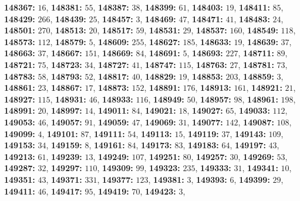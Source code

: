 \textsf{\bfseries 148367:} $16$, \textsf{\bfseries 148381:} $55$, \textsf{\bfseries 148387:} $38$, \textsf{\bfseries 148399:} $61$, \textsf{\bfseries 148403:} $19$, \textsf{\bfseries 148411:} $85$, \textsf{\bfseries 148429:} $266$, \textsf{\bfseries 148439:} $25$, \textsf{\bfseries 148457:} $3$, \textsf{\bfseries 148469:} $47$, \textsf{\bfseries 148471:} $41$, \textsf{\bfseries 148483:} $24$, \textsf{\bfseries 148501:} $270$, \textsf{\bfseries 148513:} $20$, \textsf{\bfseries 148517:} $59$, \textsf{\bfseries 148531:} $29$, \textsf{\bfseries 148537:} $160$, \textsf{\bfseries 148549:} $118$, \textsf{\bfseries 148573:} $112$, \textsf{\bfseries 148579:} $5$, \textsf{\bfseries 148609:} $255$, \textsf{\bfseries 148627:} $185$, \textsf{\bfseries 148633:} $19$, \textsf{\bfseries 148639:} $37$, \textsf{\bfseries 148663:} $37$, \textsf{\bfseries 148667:} $151$, \textsf{\bfseries 148669:} $84$, \textsf{\bfseries 148691:} $5$, \textsf{\bfseries 148693:} $227$, \textsf{\bfseries 148711:} $89$, \textsf{\bfseries 148721:} $75$, \textsf{\bfseries 148723:} $34$, \textsf{\bfseries 148727:} $41$, \textsf{\bfseries 148747:} $115$, \textsf{\bfseries 148763:} $27$, \textsf{\bfseries 148781:} $73$, \textsf{\bfseries 148783:} $58$, \textsf{\bfseries 148793:} $52$, \textsf{\bfseries 148817:} $40$, \textsf{\bfseries 148829:} $19$, \textsf{\bfseries 148853:} $203$, \textsf{\bfseries 148859:} $3$, \textsf{\bfseries 148861:} $23$, \textsf{\bfseries 148867:} $17$, \textsf{\bfseries 148873:} $152$, \textsf{\bfseries 148891:} $176$, \textsf{\bfseries 148913:} $161$, \textsf{\bfseries 148921:} $21$, \textsf{\bfseries 148927:} $115$, \textsf{\bfseries 148931:} $46$, \textsf{\bfseries 148933:} $116$, \textsf{\bfseries 148949:} $50$, \textsf{\bfseries 148957:} $98$, \textsf{\bfseries 148961:} $198$, \textsf{\bfseries 148991:} $20$, \textsf{\bfseries 148997:} $14$, \textsf{\bfseries 149011:} $84$, \textsf{\bfseries 149021:} $18$, \textsf{\bfseries 149027:} $65$, \textsf{\bfseries 149033:} $112$, \textsf{\bfseries 149053:} $46$, \textsf{\bfseries 149057:} $91$, \textsf{\bfseries 149059:} $47$, \textsf{\bfseries 149069:} $31$, \textsf{\bfseries 149077:} $142$, \textsf{\bfseries 149087:} $108$, \textsf{\bfseries 149099:} $4$, \textsf{\bfseries 149101:} $87$, \textsf{\bfseries 149111:} $54$, \textsf{\bfseries 149113:} $15$, \textsf{\bfseries 149119:} $37$, \textsf{\bfseries 149143:} $109$, \textsf{\bfseries 149153:} $34$, \textsf{\bfseries 149159:} $8$, \textsf{\bfseries 149161:} $84$, \textsf{\bfseries 149173:} $83$, \textsf{\bfseries 149183:} $64$, \textsf{\bfseries 149197:} $43$, \textsf{\bfseries 149213:} $61$, \textsf{\bfseries 149239:} $13$, \textsf{\bfseries 149249:} $107$, \textsf{\bfseries 149251:} $80$, \textsf{\bfseries 149257:} $30$, \textsf{\bfseries 149269:} $53$, \textsf{\bfseries 149287:} $32$, \textsf{\bfseries 149297:} $110$, \textsf{\bfseries 149309:} $99$, \textsf{\bfseries 149323:} $235$, \textsf{\bfseries 149333:} $31$, \textsf{\bfseries 149341:} $10$, \textsf{\bfseries 149351:} $43$, \textsf{\bfseries 149371:} $331$, \textsf{\bfseries 149377:} $123$, \textsf{\bfseries 149381:} $3$, \textsf{\bfseries 149393:} $6$, \textsf{\bfseries 149399:} $29$, \textsf{\bfseries 149411:} $46$, \textsf{\bfseries 149417:} $95$, \textsf{\bfseries 149419:} $70$, \textsf{\bfseries 149423:} $3$, 
